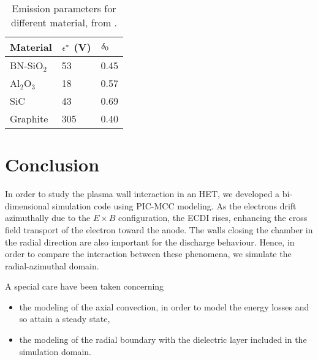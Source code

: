  \begin{table}[hbtp]
   \centering
   \caption{Emission parameters for different material, from \citet{barral2003a}.}
   \label{tab-seeparames}
   \begin{tabular}{@{}lll@{}} \toprule
   Material & $\epsilon^*$ (V)& $\delta _0$ \\ \midrule
   BN-SiO$_2$ & 53 & 0.45 \\ 
   Al$_2$O$_3$ & 18  & 0.57 \\ 
   SiC     &  43  &0.69  \\
   Graphite & 305  & 0.40 \\ 
   \bottomrule
   \end{tabular}
 \end{table}
 


\section{Conclusion}
  \label{sec-conclusion_ch1}
  
  In order to study the plasma wall interaction in an \ac{HET}, we developed a bi-dimensional simulation code using \ac{PIC}-\ac{MCC} modeling.
  As the electrons drift azimuthally due to the $E \times B$ configuration, the \ac{ECDI} rises, enhancing the cross field transport of the electron toward the anode.
  The walls closing the chamber in the radial direction are also important for the discharge behaviour.
  Hence, in order to compare the interaction between these phenomena, we simulate the radial-azimuthal domain.
  
  A special care have been taken concerning
  \begin{itemize}
    \item the modeling of the axial convection, in order to model the energy losses and so attain a steady state,
    \item the modeling of the radial boundary with the dielectric layer included in the simulation domain.
  \end{itemize}
  
  
  